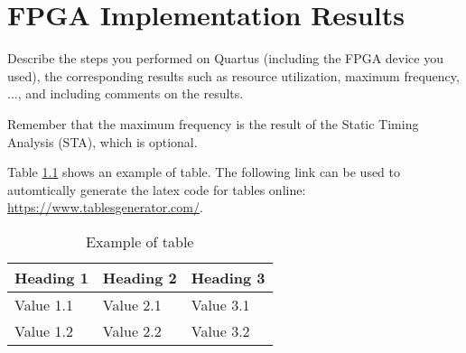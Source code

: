 \chapter{FPGA Implementation Results}\label{chapter:6}
Describe the steps you performed on Quartus (including the FPGA device you used), the corresponding results such as resource utilization, maximum frequency, ..., and including comments on the results.

Remember that the maximum frequency is the result of the Static Timing Analysis (STA), which is optional.

Table \ref{tab:example} shows an example of table. The following link can be used to automtically generate the latex code for tables online: \url{https://www.tablesgenerator.com/}.

\begin{table}[h] %
\centering
\caption{Example of table}\label{tab:example}
\begin{tabular}{lll}
\textbf{Heading 1} & \textbf{Heading 2} & \textbf{Heading 3} \\ \hline
Value 1.1 & Value 2.1 & Value 3.1 \\
Value 1.2 & Value 2.2 & Value 3.2
\end{tabular}
\end{table}
